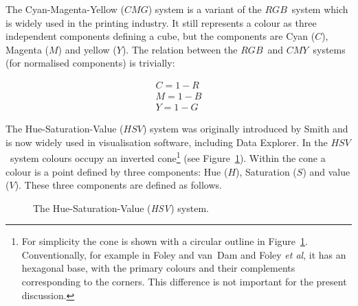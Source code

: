 The Cyan-Magenta-Yellow ($CMG$) system is a variant of the $RGB$\,
system which is widely used in the printing industry. It still
represents a colour as three independent components defining a cube,
but the components are Cyan ($C$), Magenta ($M$) and yellow ($Y$). The
relation between the $RGB$\, and $CMY$\, systems (for normalised
components) is trivially:

\begin{eqnarray}
C = 1 - R  \nonumber \\
M = 1 - B  \\
Y = 1 - G  \nonumber
\end{eqnarray}

The Hue-Saturation-Value ($HSV$) system was originally introduced by
Smith\cite{SMITH78} and is now widely used in visualisation software,
including Data Explorer. In the $HSV$\, system colours occupy an
inverted cone\footnote{For simplicity the cone is shown with a circular
outline in Figure~\ref{HSV}. Conventionally, for example in Foley and
van~Dam\cite{FOLEY1} and Foley {\it et al}\cite{FOLEY2}, it has an
hexagonal base, with the primary colours and their complements
corresponding to the corners. This difference is not important for the
present discussion.} (see Figure~\ref{HSV}). Within the cone a colour is
a point defined by three components: Hue ($H$), Saturation ($S$) and value
($V$). These three components are defined as follows.

\begin{figure}[htbp]

\begin{center}
\leavevmode
\epsfxsize=434pt
\end{center}

\caption[The Hue-Saturation-Value ({\it HSV}) system.]{The
Hue-Saturation-Value ({\it HSV}) system. \label{HSV} }

\end{figure}

